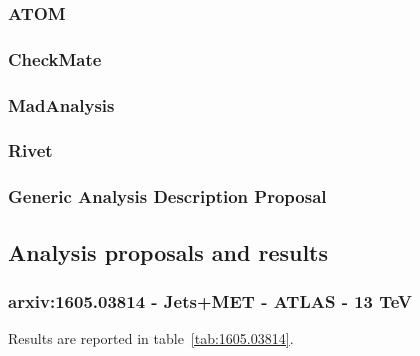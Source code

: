 \documentclass[11pt]{cernrep}
\begin{document}
\subsubsection{ATOM}
\subsubsection{CheckMate}
\subsubsection{MadAnalysis}
\subsubsection{Rivet}

\subsubsection{Generic Analysis Description Proposal}

\subsection{Analysis proposals and results}

\subsubsection{arxiv:1605.03814 - Jets+MET - ATLAS - 13 TeV}

Results are reported in table~\ref{tab:1605.03814}.
\end{document}
